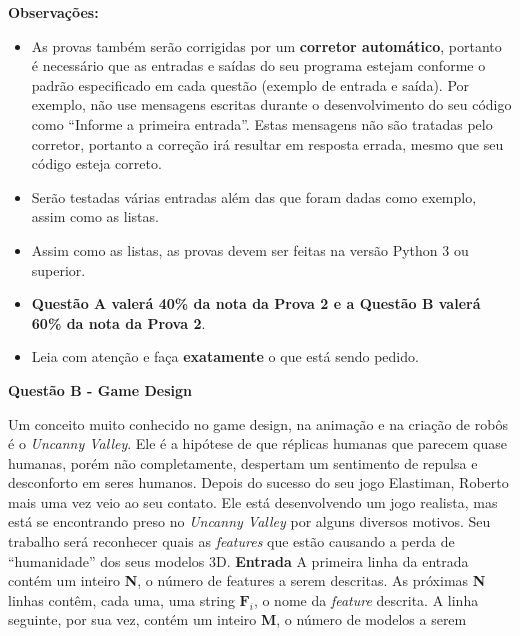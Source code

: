 \documentclass[a4paper, 12pt]{article}
\begin{document}
\textbf{{\large Observações:}}
\begin{itemize}
	\item As provas também serão corrigidas por um \textbf{corretor automático}, portanto é necessário que as entradas e saídas do seu programa estejam conforme o padrão especificado em cada questão (exemplo de entrada e saída). Por exemplo, não use mensagens escritas durante o desenvolvimento do seu código como “Informe a primeira entrada”. Estas mensagens não são tratadas pelo corretor, portanto a correção irá resultar em resposta errada, mesmo que seu código esteja correto.
	\item Serão testadas várias entradas além das que foram dadas como exemplo, assim como as listas.
	\item Assim como as listas, as provas devem ser feitas na versão Python 3 ou superior.
	\item \textbf{Questão A valerá 40\% da nota da Prova 2 e a Questão B valerá 60\% da nota da Prova 2}.
	\item Leia com atenção e faça \textbf{exatamente} o que está sendo pedido.
\end{itemize}
\newpage %
\begin{center}
\textbf{{\Large Questão B - Game Design}}
\end{center}
\vspace{5pt}
Um conceito muito conhecido no game design, na animação e na criação de robôs
é o \textit{Uncanny Valley}. Ele é a hipótese de que réplicas humanas que parecem quase
humanas, porém não completamente, despertam um sentimento de repulsa e
desconforto em seres humanos. \newline \newline
Depois do sucesso do seu jogo Elastiman, Roberto mais uma vez veio ao seu
contato. Ele está desenvolvendo um jogo realista, mas está se encontrando preso
no \textit{Uncanny Valley} por alguns diversos motivos. Seu trabalho será reconhecer
quais as \textit{features} que estão causando a perda de ``humanidade'' dos seus modelos
3D. \newline \newline
\textbf{{\large Entrada}} \newline
A primeira linha da entrada contém um inteiro \textbf{N}, o número de features a serem
descritas. \newline
As próximas \textbf{N} linhas contêm, cada uma, uma string $\textbf{F}_i$, o nome da \textit{feature} descrita. \newline
A linha seguinte, por sua vez, contém um inteiro \textbf{M}, o número de modelos a serem
\end{document}

